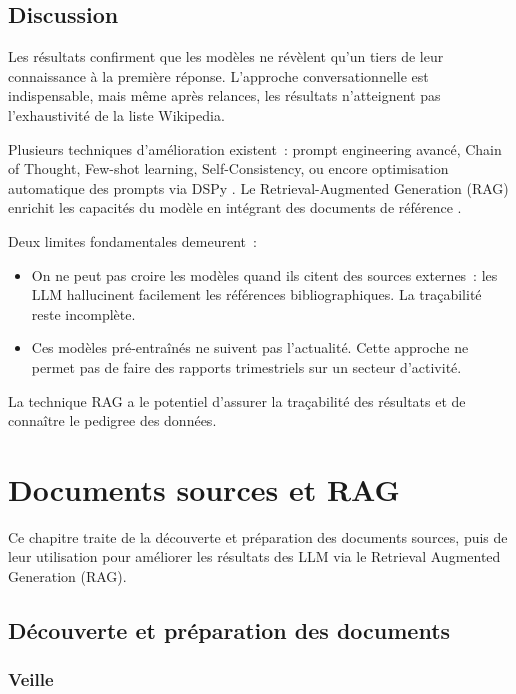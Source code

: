 \documentclass[a4paper,11pt]{report}
\begin{document}
\section{Discussion}

Les résultats confirment que les modèles ne révèlent qu'un tiers de leur connaissance à la première réponse. L'approche conversationnelle est indispensable, mais même après relances, les résultats n'atteignent pas l'exhaustivité de la liste Wikipedia.

Plusieurs techniques d'amélioration existent~: prompt engineering avancé, Chain of Thought, Few-shot learning, Self-Consistency, ou encore optimisation automatique des prompts via DSPy \citep{ATRGAC9J}. Le Retrieval-Augmented Generation (RAG) \citep{2U9Y8AJK} enrichit les capacités du modèle en intégrant des documents de référence \citep{JNKUDLN8,Y95UBRJ9}.

Deux limites fondamentales demeurent~:

\begin{itemize}
\item On ne peut pas croire les modèles quand ils citent des sources externes~: les LLM hallucinent facilement les références bibliographiques. La traçabilité reste incomplète.
\item Ces modèles pré-entraînés ne suivent pas l'actualité. Cette approche ne permet pas de faire des rapports trimestriels sur un secteur d'activité.
\end{itemize}

La technique RAG a le potentiel d'assurer la traçabilité des résultats et de connaître le pedigree des données.

\chapter{Documents sources et RAG}\label{chap:rag}

Ce chapitre traite de la découverte et préparation des documents sources, puis de leur utilisation pour améliorer les résultats des LLM via le Retrieval Augmented Generation (RAG).

\section{Découverte et préparation des documents}

\subsection{Veille}
\end{document}
